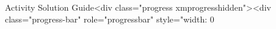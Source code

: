 Activity Solution Guide<div class="progress xmprogresshidden"><div class="progress-bar" role="progressbar" style="width: 0%